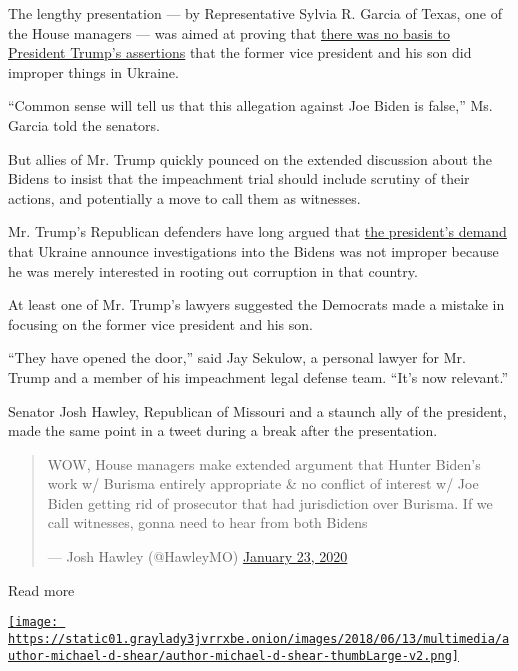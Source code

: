 The lengthy presentation --- by Representative Sylvia R. Garcia of
Texas, one of the House managers --- was aimed at proving that
\href{https://www.nytimes3xbfgragh.onion/2019/09/22/us/politics/biden-ukraine-trump.html}{there
was no basis to President Trump's assertions} that the former vice
president and his son did improper things in Ukraine.

``Common sense will tell us that this allegation against Joe Biden is
false,'' Ms. Garcia told the senators.

But allies of Mr. Trump quickly pounced on the extended discussion about
the Bidens to insist that the impeachment trial should include scrutiny
of their actions, and potentially a move to call them as witnesses.

Mr. Trump's Republican defenders have long argued that
\href{https://www.nytimes3xbfgragh.onion/interactive/2020/01/22/us/politics/impeachment-articles-arguments.html}{the
president's demand} that Ukraine announce investigations into the Bidens
was not improper because he was merely interested in rooting out
corruption in that country.

At least one of Mr. Trump's lawyers suggested the Democrats made a
mistake in focusing on the former vice president and his son.

``They have opened the door,'' said Jay Sekulow, a personal lawyer for
Mr. Trump and a member of his impeachment legal defense team. ``It's now
relevant.''

Senator Josh Hawley, Republican of Missouri and a staunch ally of the
president, made the same point in a tweet during a break after the
presentation.

\begin{quote}
WOW, House managers make extended argument that Hunter Biden's work w/
Burisma entirely appropriate \& no conflict of interest w/ Joe Biden
getting rid of prosecutor that had jurisdiction over Burisma. If we call
witnesses, gonna need to hear from both Bidens

--- Josh Hawley (@HawleyMO)
\href{https://twitter.com/HawleyMO/status/1220441589404917762?ref_src=twsrc\%5Etfw}{January
23, 2020}
\end{quote}

Read more

\href{https://www.nytimes3xbfgragh.onion/by/michael-d-shear}{\texttt{[image: https://static01.graylady3jvrrxbe.onion/images/2018/06/13/multimedia/author-michael-d-shear/author-michael-d-shear-thumbLarge-v2.png]}}

